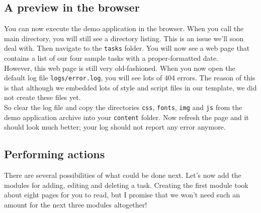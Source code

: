 \documentclass{scrartcl}
\begin{document}
   \subsection{A preview in the browser}
      You can now execute the demo application in the browser. When you call the main directory, you will still see a directory listing. This is an issue we'll soon deal with. Then navigate to the \texttt{tasks} folder. You will now see a web page that contains a list of our four sample tasks with a proper-formatted date. \\
      However, this web page is still very old-fashioned. When you now open the default log file \texttt{logs/error.log}, you will see lots of 404 errors. The reason of this is that although we embedded lots of style and script files in our template, we did not create these files yet. \\
      So clear the log file and copy the directories \texttt{css}, \texttt{fonts}, \texttt{img} and \texttt{js} from the demo application archive into your \texttt{content} folder. Now refresh the page and it should look much better; your log should not report any error anymore.
   \subsection{Performing actions}
      There are several possibilities of what could be done next. Let's now add the modules for adding, editing and deleting a task. Creating the first module took about eight pages for you to read, but I promise that we won't need such an amount for the next three modules altogether!
\end{document}
